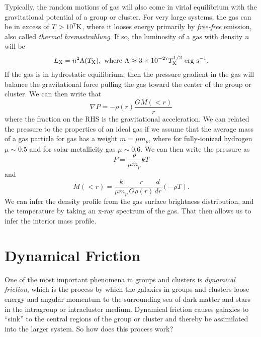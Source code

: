 \documentclass[]{article}
\begin{document}
Typically, the random motions of gas will also come in 
virial equilibrium with the gravitational potential of a
group or cluster.  For very large systems, the gas can be
in excess of $T>10^{7}\mathrm{K}$, where it looses energy primarily
by {\it free-free} emission, also called {\it thermal bremsstrahlung}.
If so, the luminosity of a gas with density $n$ will be
\begin{equation}
L_{\mathrm{X}} = n^2 \Lambda(T_{\mathrm{X}}),~\mathrm{where}~\Lambda\approx3\times10^{-27}T_{\mathrm{X}}^{1/2}~\mathrm{erg}~\mathrm{s}^{-1}.
\end{equation}
\noindent
If the gas is in hydrostatic equilibrium, then
the pressure gradient in the gas will balance the gravitational
force pulling the gas toward the center of the group or cluster.
We can then write that
\begin{equation}
\nabla P = -\rho(r) \frac{GM(<r)}{r}
\end{equation}
\noindent
where the fraction on the RHS is the gravitational acceleration.
We can related the pressure to the properties of an ideal gas
if we assume that the average mass of a gas particle for 
gas has a weight $m = \mu m_{p}$, where for fully-ionized
hydrogen $\mu\sim0.5$ and for solar metallicity gas $\mu\sim0.6$.
We can then write the pressure as
\begin{equation}
P = \frac{\rho}{\mu m_{p}}kT
\end{equation}
\noindent
and
\begin{equation}
M(<r) = \frac{k}{\mu m_p}\frac{r}{G \rho(r)} \frac{d}{dr}(-\rho T).
\end{equation}
\noindent
We can infer the density profile from the gas surface brightness
distribution, and the temperature by taking an x-ray spectrum of the
gas.  That then allows us to infer the interior mass profile.

\section{Dynamical Friction}

One of the most important phenomena in groups and clusters is
{\it dynamical friction}, which is the process by which the
galaxies in groups and clusters loose energy and angular momentum
to the surrounding sea of dark matter and stars in the intragroup
or intracluster medium. Dynamical friction causes galaxies to ``sink''
to the central regions of the group or cluster and thereby be
assimilated into the larger system.  So how does this process work?
\end{document}
